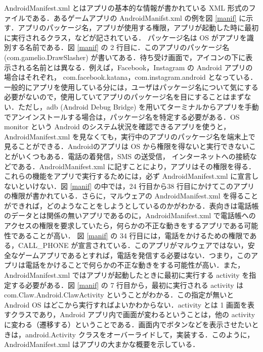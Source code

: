 AndroidManifest.xml とはアプリの基本的な情報が書かれている XML 形式のファイルである．あるゲームアプリの AndroidManifst.xml の例を図 \ref{manif} に示す．アプリのパッケージ名，アプリが使用する権限，アプリが起動した時に最初に実行されるクラス，などが記されている． パッケージ名は OS がアプリを識別する名前である．図 \ref{manif} の 2 行目に．このアプリのパッケージ名 (com.gamelio.DrawSlasher) が書いてある．待ち受け画面で，アイコンの下に表示される名前とは異なる．例えば，Facebook，Instagram の Android アプリの場合はそれぞれ， com.facebook.katana，com.instagram.android となっている．一般的にアプリを使用している分には，ユーザはパッケージ名について気にする必要がないので，使用していてアプリのパッケージ名を目にすることはまずない．ただし，adb (Android Debug Bridge) を用いてターミナルからアプリを手動でアンインストールする場合は，パッケージ名を特定する必要がある．OS monitor という Android のシステム状況を確認できるアプリを使うと，AndroidManifest.xml を見なくても，実行中のアプリのパッケージ名を端末上で見ることができる．Androidのアプリは OS から権限を得ないと実行できないことがいくつもある．電話の着発信，SMS の送受信， インターネットへの接続などである．AndroidManifest.xml に記すことにより，アプリはその権限を得る．これらの機能をアプリで実行するためには，必ず AndroidManifest.xml に宣言しないといけない．図 \ref{manif} の中では，24 行目から38 行目にかけてこのアプリの権限が書かれている．さらに，マルウェアの AndroidManifest.xml を得ることができれば，どのようなことをしようとしているのかがわかる．表向きは電話帳のデータとは関係の無いアプリであるのに，AndroidManifest.xml で電話帳へのアクセスの権限を要求していたら，何らかの不正な動きをするアプリである可能性であることが高い． 図 \ref{manif} の 34 行目には，電話をかけるための権限である，CALL\_PHONE が宣言されている．このアプリがマルウェアではない，安全なゲームアプリであるとすれば，電話を発信する必要はない．つまり，このアプリは電話をかけることで何らかの不正な動きをする可能性が高い．また，AndroidManifest.xml ではアプリが起動したときに最初に実行する activity を指定する必要がある．図 \ref{manif} の 7 行目から，最初に実行される activity は com.Claw.Android.ClawActivity ということがわかる．この指定が無いと Android OS はどこから実行すればよいかわからない．activity とは 1 画面を表すクラスであり，Android アプリ内で画面が変わるということは，他の activity に変わる（遷移する）ということである．画面内でボタンなどを表示させたいときは，android.Activity クラスをオーバーライドして，実装する．このように，AndroidManifest.xml はアプリの大まかな概要を示している．

